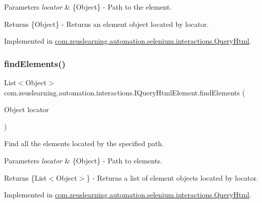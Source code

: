 \begin{DoxyParams}{Parameters}
{\em locator} & \{Object\} -\/ Path to the element. \\
\hline
\end{DoxyParams}
\begin{DoxyReturn}{Returns}
\{Object\} -\/ Returns an element object located by {\ttfamily locator}. 
\end{DoxyReturn}


Implemented in \hyperlink{classcom_1_1zeuslearning_1_1automation_1_1selenium_1_1interactions_1_1QueryHtml_a21ff6c1d862318a3e5beff87a1336a75}{com.\+zeuslearning.\+automation.\+selenium.\+interactions.\+Query\+Html}.

\hypertarget{interfacecom_1_1zeuslearning_1_1automation_1_1interactions_1_1IQueryHtmlElement_a5c5990f50e669bc767e14aa9b8907b9b}{}\label{interfacecom_1_1zeuslearning_1_1automation_1_1interactions_1_1IQueryHtmlElement_a5c5990f50e669bc767e14aa9b8907b9b} 
\subsubsection{\texorpdfstring{find\+Elements()}{findElements()}}
{\footnotesize\ttfamily List$<$Object$>$ com.\+zeuslearning.\+automation.\+interactions.\+I\+Query\+Html\+Element.\+find\+Elements (\begin{DoxyParamCaption}\item[{Object}]{locator }\end{DoxyParamCaption})}

Find all the elements located by the specified path.


\begin{DoxyParams}{Parameters}
{\em locator} & \{Object\} -\/ Path to elements. \\
\hline
\end{DoxyParams}
\begin{DoxyReturn}{Returns}
\{List$<$\+Object$>$\} -\/ Returns a list of element objects located by {\ttfamily locator}. 
\end{DoxyReturn}


Implemented in \hyperlink{classcom_1_1zeuslearning_1_1automation_1_1selenium_1_1interactions_1_1QueryHtml_a3161a36666e8a81d86855c82b39e20ce}{com.\+zeuslearning.\+automation.\+selenium.\+interactions.\+Query\+Html}.

